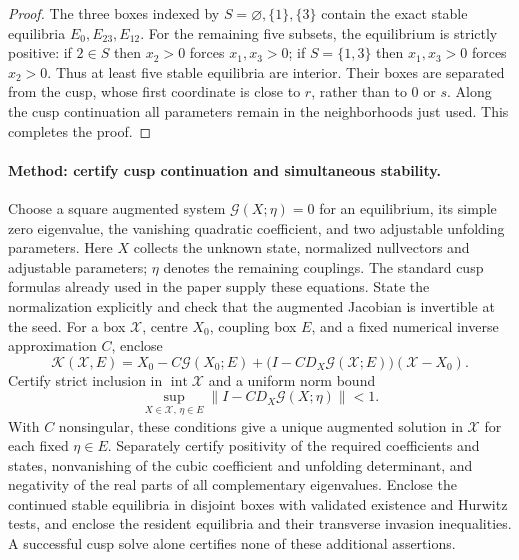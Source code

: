 \begin{proof}
The three boxes indexed by $S=\varnothing,\{1\},\{3\}$
contain the exact stable equilibria $E_0,E_{23},E_{12}$.
For the remaining five subsets, the equilibrium is
strictly positive: if $2\in S$ then $x_2>0$ forces
$x_1,x_3>0$; if $S=\{1,3\}$ then $x_1,x_3>0$
forces $x_2>0$. Thus at least five stable equilibria
are interior. Their boxes are separated from the cusp,
whose first coordinate is close to $r$, rather than
to $0$ or $s$. Along the cusp continuation all parameters
remain in the neighborhoods just used. This completes
the proof.
\end{proof}

\paragraph{Method: certify cusp continuation and simultaneous stability.}
Choose a square augmented system $\mathcal G(X;\eta)=0$ for an equilibrium, its simple zero
eigenvalue, the vanishing quadratic coefficient, and two adjustable unfolding parameters. Here $X$
collects the unknown state, normalized nullvectors and adjustable parameters; $\eta$ denotes the
remaining couplings. The standard cusp formulas already used in the paper supply these equations.
State the normalization explicitly and check that the augmented Jacobian is invertible at the seed.
For a box $\mathcal X$, centre $X_0$, coupling box $E$, and a fixed numerical inverse approximation
$C$, enclose
\[
 \mathcal K(\mathcal X,E)
 =X_0-C\mathcal G(X_0;E)
  +\bigl(I-C D_X\mathcal G(\mathcal X;E)\bigr)(\mathcal X-X_0).
\]
Certify strict inclusion in $\operatorname{int}\mathcal X$ and a uniform norm bound
\[
 \sup_{X\in\mathcal X,\,\eta\in E}\|I-C D_X\mathcal G(X;\eta)\|<1.
\]
With $C$ nonsingular, these conditions give a unique augmented solution in $\mathcal X$ for each
fixed $\eta\in E$. Separately certify positivity of the required coefficients and states,
nonvanishing of the cubic coefficient and unfolding determinant, and negativity of the real parts
of all complementary eigenvalues. Enclose the continued stable equilibria in disjoint boxes with
validated existence and Hurwitz tests, and enclose the resident equilibria and their transverse
invasion inequalities. A successful cusp solve alone certifies none of these additional assertions.

